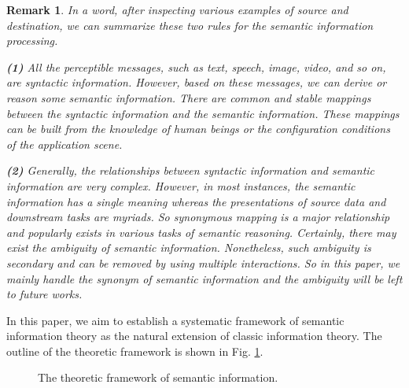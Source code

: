 \documentclass[12pt, draftclsnofoot,onecolumn]{IEEEtran}
\newtheorem{remark}{\bf{Remark}}
\begin{document}
\begin{remark}
In a word, after inspecting various examples of source and destination, we can summarize these two rules for the semantic information processing.

\textbf{(1)} All the perceptible messages, such as text, speech, image, video, and so on, are syntactic information. However, based on these messages, we can derive or reason some semantic information. There are common and stable mappings between the syntactic information and the semantic information. These mappings can be built from the knowledge of human beings or the configuration conditions of the application scene.

\textbf{(2)} Generally, the relationships between syntactic information and semantic information are very complex. However, in most instances, the semantic information has a single meaning whereas the presentations of source data and downstream tasks are myriads. So synonymous mapping is a major relationship and popularly exists in various tasks of semantic reasoning. Certainly, there may exist the ambiguity of semantic information. Nonetheless, such ambiguity is secondary and can be removed by using multiple interactions. So in this paper, we mainly handle the synonym of semantic information and the ambiguity will be left to future works.
\end{remark}

In this paper, we aim to establish a systematic framework of semantic information theory as the natural extension of classic information theory. The outline of the theoretic framework is shown in Fig. \ref{SIT_framework}.

\begin{figure}[htbp]
\setlength{\abovecaptionskip}{0.cm}
\setlength{\belowcaptionskip}{-0.cm}
  \caption{The theoretic framework of semantic information.}\label{SIT_framework}
\end{figure}
\end{document}
